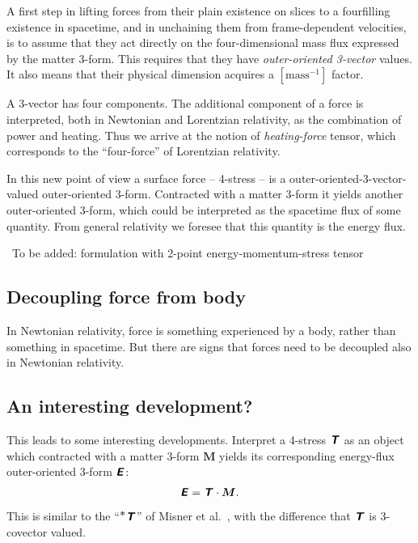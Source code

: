 \documentclass[\ifafour a4paper,12pt,\else a5paper,10pt,\fi%
onecolumn,oneside,article,%
british%
]{memoir}
\theoremstyle{remark}
\theoremstyle{innote}
\newcommand*{\mathte}[1]{\textbf{\textit{\textsf{#1}}}}
\newcommand*{\citep}{\parencites}
\renewcommand*{\cites}{\parencites}
\renewcommand*{\|}{\nonscript\,\vert\nonscript\;\mathopen{}}
\newcommand*{\sect}{\S}%
\newcommand*{\sects}{\S\S}%
\newcommand*{\chap}{ch.}%
\newcommand*{\etal}{{et al.}}
\newcommand*{\puzzle}{{\fontencoding{U}\fontfamily{fontawesometwo}\selectfont\symbol{225}}}
\newcommand{\mynote}[1]{ {\color{notecolour}\puzzle\ #1}}
\newcommand*{\yrr}{M}
\newcommand*{\yr}{\bm{\yrr}}
\newcommand*{\yEE}{E}
\newcommand*{\yE}{\mathte{\yEE}}
\newcommand*{\yTTf}{T}
\newcommand*{\yTf}{\mathte{\yTTf}}
\begin{document}
A first step in lifting forces from their plain existence on slices to a
fourfilling existence in spacetime, and in unchaining them from
frame-dependent velocities, is to assume that they act directly on the
four-dimensional mass flux expressed by the matter 3-form. This requires
that they have \emph{outer-oriented 3-vector} values. It also means that
their physical dimension acquires a $[\text{mass}^{-1}]$ factor.

A 3-vector has four components. The additional component of a force is
interpreted, both in Newtonian \cites[\sects~152--154,
288--289]{truesdelletal1960}[\sect~2.3]{grotetal1966} and Lorentzian
\cites{eckart1940c}[\sect~2.3]{grotetal1966}{maugin1978b} relativity, as
the combination of power and heating. Thus we arrive at the notion of
\emph{heating-force} tensor, which corresponds to the \enquote{four-force}
of Lorentzian relativity.

In this new point of view a surface force -- 4-stress -- is a
outer-oriented-3-vector-valued outer-oriented 3-form. Contracted with a
matter 3-form it yields another outer-oriented 3-form, which could be
interpreted as the spacetime flux of some quantity. From general relativity
we foresee that this quantity is the energy flux.

\mynote{To be added: formulation with 2-point energy-momentum-stress tensor \citep[\sect~288]{truesdelletal1960}}

\subsection{Decoupling force from body}
\label{sec:decoupling_force_body}

In Newtonian relativity, force is something experienced by a body, rather
than something in spacetime. But there are signs that forces need to be
decoupled also in Newtonian relativity.


\subsection{An interesting development?}
\label{sec:interesting_development}


This leads to some interesting developments. Interpret a 4-stress $\yTf$ as
an object which contracted with a matter 3-form $\yr$ yields its
corresponding energy-flux outer-oriented 3-form $\yE$:
\begin{equation}
  \label{eq:stress-matter-momentum}
  \yE = \yTf \cdot \yr.
\end{equation}
This is similar to the \enquote{$^{\displaystyle *}\yTf$} of Misner \etal\
\citep[\chap~15]{misneretal1970_r2003}, with the difference that $\yTf$ is
3-covector valued.
\end{document}
